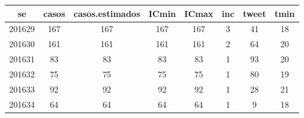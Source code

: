 \begin{tabular}{c|ccccccc}
  \hline
se & casos & casos.estimados & ICmin & ICmax & inc & tweet & tmin \\ 
  \hline
201629 & 167 & 167 & 167 & 167 & 3 & 41 & 18 \\ 
  201630 & 161 & 161 & 161 & 161 & 2 & 64 & 20 \\ 
  201631 & 83 & 83 & 83 & 83 & 1 & 93 & 20 \\ 
  201632 & 75 & 75 & 75 & 75 & 1 & 80 & 19 \\ 
  201633 & 92 & 92 & 92 & 92 & 1 & 28 & 21 \\ 
  201634 & 64 & 64 & 64 & 64 & 1 & 9 & 18 \\ 
   \hline
\end{tabular}
